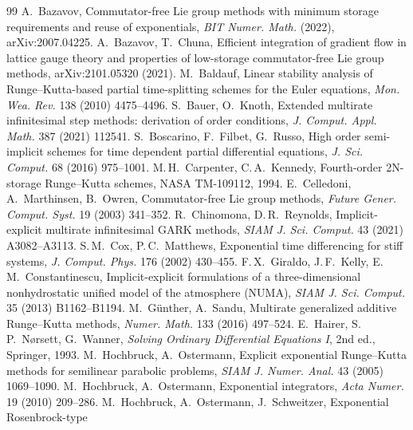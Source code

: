 \documentclass[11pt,a4paper]{article}
\theoremstyle{definition}
\theoremstyle{remark}
\begin{document}
\begin{thebibliography}{99}
\small
{} A.~Bazavov, Commutator-free Lie group methods with minimum storage requirements and reuse of
 exponentials, \emph{BIT Numer. Math.} (2022), arXiv:2007.04225.
 A.~Bazavov, T.~Chuna, Efficient integration of gradient flow in lattice gauge theory and
 properties of low-storage commutator-free Lie group methods, arXiv:2101.05320 (2021).
 M.~Baldauf, Linear stability analysis of Runge--Kutta-based partial time-splitting schemes for the
 Euler equations, \emph{Mon. Wea. Rev.} 138 (2010) 4475--4496.
 S.~Bauer, O.~Knoth, Extended multirate infinitesimal step methods: derivation of order
 conditions, \emph{J. Comput. Appl. Math.} 387 (2021) 112541.
 S.~Boscarino, F.~Filbet, G.~Russo, High order semi-implicit schemes for time
 dependent partial differential equations, \emph{J. Sci. Comput.} 68 (2016) 975--1001.
 M.\,H.~Carpenter, C.\,A.~Kennedy, Fourth-order 2N-storage Runge--Kutta schemes, NASA
 TM-109112, 1994.
 E.~Celledoni, A.~Marthinsen, B.~Owren, Commutator-free Lie group methods,
 \emph{Future Gener. Comput. Syst.} 19 (2003) 341--352.
 R.~Chinomona, D.\,R.~Reynolds, Implicit-explicit multirate infinitesimal GARK methods,
 \emph{SIAM J. Sci. Comput.} 43 (2021) A3082--A3113.
 S.\,M.~Cox, P.\,C.~Matthews, Exponential time differencing for stiff systems, \emph{J.
 Comput. Phys.} 176 (2002) 430--455.
 F.\,X.~Giraldo, J.\,F.~Kelly, E.\,M.~Constantinescu, Implicit-explicit
 formulations of a three-dimensional nonhydrostatic unified model of the atmosphere (NUMA), \emph{SIAM J. Sci. Comput.}
 35 (2013) B1162--B1194.
 M.~G\"unther, A.~Sandu, Multirate generalized additive Runge--Kutta methods, \emph{Numer.
 Math.} 133 (2016) 497--524.
 E.~Hairer, S.\,P.~N{\o}rsett, G.~Wanner, \emph{Solving Ordinary Differential
 Equations I}, 2nd ed., Springer, 1993.
 M.~Hochbruck, A.~Ostermann, Explicit exponential Runge--Kutta methods for semilinear
 parabolic problems, \emph{SIAM J. Numer. Anal.} 43 (2005) 1069--1090.
 M.~Hochbruck, A.~Ostermann, Exponential integrators, \emph{Acta Numer.} 19 (2010)
 209--286.
 M.~Hochbruck, A.~Ostermann, J.~Schweitzer, Exponential Rosenbrock-type

\end{thebibliography}
\end{document}
